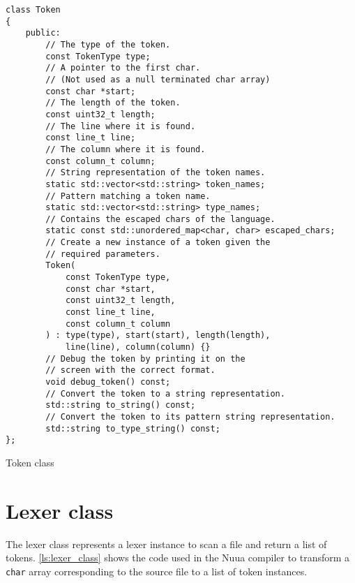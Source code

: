 \begin{listing}[H]
\begin{verbatim}
class Token
{
    public:
        // The type of the token.
        const TokenType type;
        // A pointer to the first char.
        // (Not used as a null terminated char array)
        const char *start;
        // The length of the token.
        const uint32_t length;
        // The line where it is found.
        const line_t line;
        // The column where it is found.
        const column_t column;
        // String representation of the token names.
        static std::vector<std::string> token_names;
        // Pattern matching a token name.
        static std::vector<std::string> type_names;
        // Contains the escaped chars of the language.
        static const std::unordered_map<char, char> escaped_chars;
        // Create a new instance of a token given the
        // required parameters.
        Token(
            const TokenType type,
            const char *start,
            const uint32_t length,
            const line_t line,
            const column_t column
        ) : type(type), start(start), length(length),
            line(line), column(column) {}
        // Debug the token by printing it on the
        // screen with the correct format.
        void debug_token() const;
        // Convert the token to a string representation.
        std::string to_string() const;
        // Convert the token to its pattern string representation.
        std::string to_type_string() const;
};
\end{verbatim}
\caption{Token class}
\label{ls:token_class}
\end{listing}

\section{Lexer class}

The lexer class represents a lexer instance to scan a file and return a list of tokens.
\autoref{ls:lexer_class} shows the code used in the Nuua compiler to transform a \texttt{char} array
corresponding to the source file to a list of token instances.

